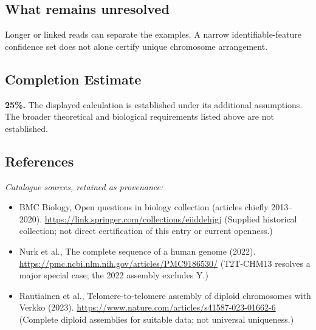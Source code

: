 \documentclass[11pt]{article}
\begin{document}
\subsection{What remains unresolved}
Longer or linked reads can separate the examples. A narrow identifiable-feature confidence set does not alone certify unique chromosome arrangement.
\subsection{Completion Estimate}
\textbf{25\%.} The displayed calculation is established under its additional assumptions. The broader theoretical and biological requirements listed above are not established.
\subsection{References}
\noindent\emph{Catalogue sources, retained as provenance:}
\begin{itemize}
\item BMC Biology, Open questions in biology collection (articles chiefly 2013--2020). \url{https://link.springer.com/collections/eiiddehjgj} (Supplied historical collection; not direct certification of this entry or current openness.)
\item Nurk et al., The complete sequence of a human genome (2022). \url{https://pmc.ncbi.nlm.nih.gov/articles/PMC9186530/} (T2T-CHM13 resolves a major special case; the 2022 assembly excludes Y.)
\item Rautiainen et al., Telomere-to-telomere assembly of diploid chromosomes with Verkko (2023). \url{https://www.nature.com/articles/s41587-023-01662-6} (Complete diploid assemblies for suitable data; not universal uniqueness.)
\end{itemize}
\clearpage


\appendix
\end{document}
